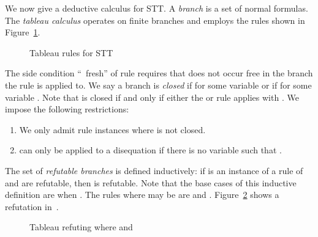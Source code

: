 We now give a deductive calculus for STT.
A \emph{branch} is a set of normal formulas.  The
\emph{tableau calculus } operates on finite branches
and employs the rules shown in
Figure~\ref{fig-tableau-rules}.
\begin{figure}[t]
\caption{Tableau rules for STT}
\label{fig-tableau-rules}
\end{figure}
The side condition ``~fresh'' of rule \TRFE requires
that  does not occur free in the branch the rule is
applied to.  
We say a branch  is \emph{closed} if  for some variable 
or if  for some variable .
Note that  is closed if and only if either the  or  rule 
applies with .
We impose the following restrictions:
\begin{enumerate}[(1)]
\item We only admit rule instances  where  is not closed.
\item \TRFE can only be applied to a disequation
   if there is no variable  such that .
\end{enumerate}
The set of \emph{refutable branches} is
defined inductively: if  is
an instance of a rule of~ and  are
refutable, then  is refutable.
Note that the base cases of this inductive definition are when .
The rules where  may be  are  and .
Figure~\ref{fig:refutation} shows a refutation
in~.

\begin{figure}[t]
  
\caption{Tableau refuting 
  where  and }
\label{fig:refutation}
\end{figure}

